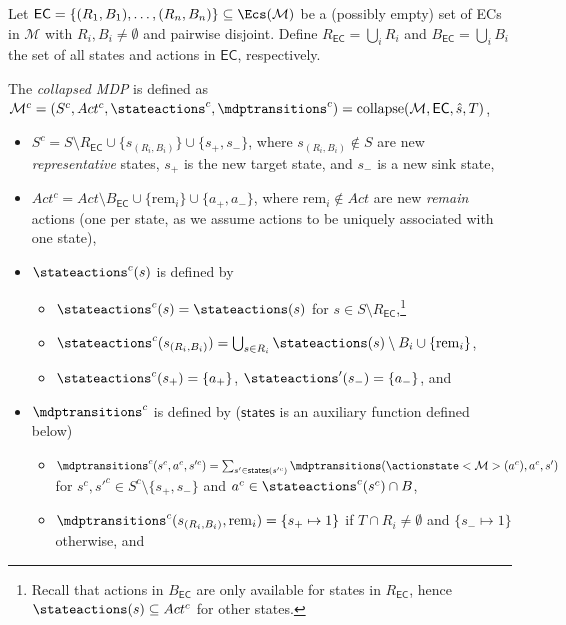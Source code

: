 \documentclass{theoretics}
\newcommand{\unionSym}{\cup}
\newcommand{\unionBin}{\mathbin{\unionSym}}
\newcommand{\intersectionSym}{\cap}
\newcommand{\intersectionBin}{\mathbin{\intersectionSym}}
\newcommand{\UnionSym}{\bigcup}
\newcommand{\union}{\unionBin}
\newcommand{\intersection}{\intersectionBin}
\newcommand{\Union}{\UnionSym}
\newcommand{\MDP}{\mathcal{M}}
\newcommand{\States}{S}
\newcommand{\initialstate}{\hat{s}}
\newcommand{\Actions}{Act}
\newcommand{\targetstate}{s_+}
\newcommand{\sinkstate}{s_-}
\newcommand{\targetset}{T}
\DeclareMathOperator{\collapse}{collapse}
\newcommand{\ecremain}{\mathrm{rem}}
\newcommand{\ecstates}{\mathsf{states}}
\newcommand{\algoecs}{\mathsf{EC}}
\begin{document}
\begin{definition}
	Let $\algoecs = \{(R_1, B_1), \dots, (R_n, B_n)\} \subseteq \Ecs(\MDP)$ be a (possibly empty) set of ECs in $\MDP$ with $R_i, B_i \neq \emptyset$ and pairwise disjoint.
	Define $R_{\algoecs} = \Union_i R_i$ and $B_{\algoecs} = \Union_i B_i$ the set of all states and actions in $\algoecs$, respectively.
	
	The \emph{collapsed MDP} is defined as $\MDP^c = (\States^c, \Actions^c, \stateactions^c, \mdptransitions^c) = \collapse(\MDP, \algoecs, \initialstate, \targetset)$,
	\begin{itemize}
		\item $\States^c = \States \setminus R_{\algoecs} \union \{s_{(R_i,B_i)}\} \union \{\targetstate, \sinkstate\}$, where $s_{(R_i, B_i)} \notin \States$ are new \emph{representative} states, $\targetstate$ is the new target state, and $\sinkstate$ is a new sink state,
		\item $\Actions^c = \Actions \setminus B_{\algoecs} \union \{\ecremain_i\} \union \{a_+, a_-\}$, where $\ecremain_i \notin \Actions$ are new \emph{remain} actions (one per state, as we assume actions to be uniquely associated with one state),
		\item $\stateactions^c(s)$ is defined by
		\begin{itemize}
			\item $\stateactions^c(s) = \stateactions(s)$ for $s \in \States \setminus R_{\algoecs}$,\footnote{Recall that actions in $B_{\algoecs}$ are only available for states in $R_{\algoecs}$, hence $\stateactions(s) \subseteq \Actions^c$ for other states.}
			\item $\stateactions^c(s_{(R_i,B_i)}) = \Union_{s \in R_i} \stateactions(s) \setminus B_i \union \{\ecremain_i\}$,
			\item $\stateactions^c(\targetstate) = \{a_+\}$, $\stateactions'(\sinkstate) = \{a_-\}$, and
		\end{itemize}
		\item $\mdptransitions^c$ is defined by ($\ecstates$ is an auxiliary function defined below)
		\begin{itemize}
			\item $\mdptransitions^c(s^c, a^c, s'^c) = \sum_{s' \in \ecstates(s'^c)} \mdptransitions(\actionstate<\MDP>(a^c), a^c, s')$ for $s^c, s'^c \in \States^c \setminus \{\targetstate, \sinkstate\}$ and $a^c \in \stateactions^c(s^c) \intersection B$,
			\item $\mdptransitions^c(s_{(R_i,B_i)}, \ecremain_i) = \{\targetstate \mapsto 1\}$ if $\targetset \intersection R_i \neq \emptyset$ and $\{\sinkstate \mapsto 1\}$ otherwise, and

\end{itemize}
\end{itemize}
\end{definition}
\end{document}

